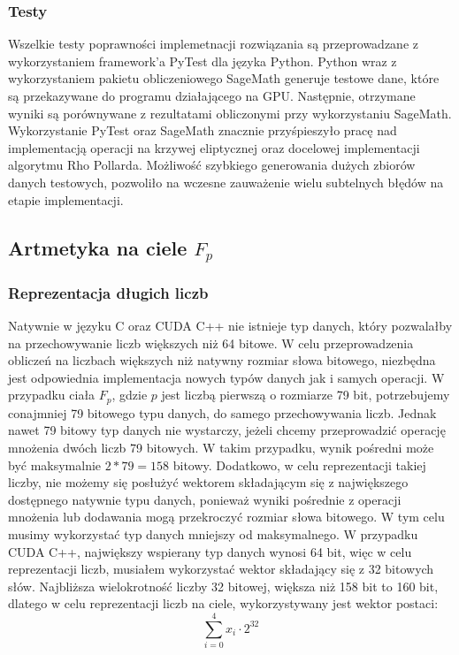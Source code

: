 \subsubsection{Testy}
Wszelkie testy poprawności implemetnacji rozwiązania są przeprowadzane z wykorzystaniem framework'a PyTest dla języka Python.
Python wraz z wykorzystaniem pakietu obliczeniowego SageMath generuje testowe dane, które
są przekazywane do programu działającego na GPU. Następnie, otrzymane wyniki są porównywane z rezultatami
obliczonymi przy wykorzystaniu SageMath. Wykorzystanie PyTest oraz SageMath znacznie przyśpieszyło pracę
nad implementacją operacji na krzywej eliptycznej oraz docelowej implementacji algorytmu Rho Pollarda.
Możliwość szybkiego generowania dużych zbiorów danych testowych, pozwoliło na wczesne zauważenie wielu subtelnych błędów
na etapie implementacji.



\subsection{Artmetyka na ciele $F_{p}$}
\subsubsection{Reprezentacja długich liczb}
Natywnie w języku C oraz CUDA C++ nie istnieje typ danych, który pozwalałby na przechowywanie liczb większych niż 64 bitowe.
W celu przeprowadzenia obliczeń na liczbach większych niż natywny rozmiar słowa bitowego,
niezbędna jest odpowiednia implementacja nowych typów danych jak i samych operacji.
W przypadku ciała $F_{p}$, gdzie $p$ jest liczbą pierwszą o rozmiarze 79 bit, potrzebujemy conajmniej 79 bitowego typu danych, do samego przechowywania liczb.
Jednak nawet 79 bitowy typ danych nie wystarczy, jeżeli chcemy przeprowadzić operację mnożenia
dwóch liczb 79 bitowych. W takim przypadku, wynik pośredni może być maksymalnie $2*79 = 158$ bitowy.
Dodatkowo, w celu reprezentacji takiej liczby, nie możemy się posłużyć wektorem składającym się z największego
dostępnego natywnie typu danych,
ponieważ wyniki pośrednie z operacji mnożenia lub dodawania mogą przekroczyć rozmiar słowa bitowego.
W tym celu musimy wykorzystać typ danych mniejszy od maksymalnego. W przypadku CUDA C++, największy wspierany typ danych
wynosi 64 bit, więc w celu reprezentacji liczb, musiałem wykorzystać wektor składający się z 32 bitowych słów.
Najbliższa wielokrotność liczby 32 bitowej, większa niż 158 bit to 160 bit,
dlatego w celu reprezentacji liczb na ciele, wykorzystywany jest wektor postaci:
$$
    \sum_{i = 0}^{4} x_i\cdot 2^{32}
$$

